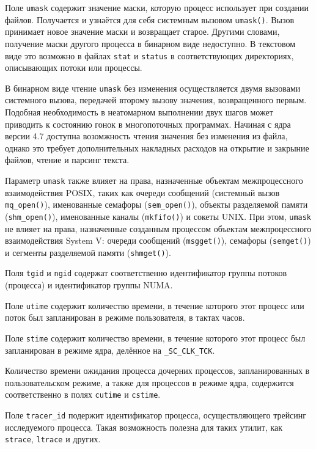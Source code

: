 Поле \texttt{umask} содержит значение маски, которую процесс использует при
создании файлов. Получается и узнаётся для себя системным вызовом
\texttt{umask()}. Вызов принимает новое значение маски и возвращает старое.
Другими словами, получение маски другого процесса в бинарном виде недоступно.
В текстовом виде это возможно в файлах \texttt{stat} и \texttt{status} в
соответствующих директориях, описывающих потоки или процессы.

В бинарном виде чтение \texttt{umask} без изменения осуществляется двумя
вызовами системного вызова, передачей второму вызову значения, возвращенного
первым. Подобная необходимость в неатомарном выполнении двух шагов может
приводить к состоянию гонок в многопоточных программах. Начиная с ядра версии
4.7 доступна возомжность чтения значения без изменения из файла, однако это
требует дополнительных накладных расходов на открытие и закрыние файлов, чтение
и парсинг текста.

Параметр \texttt{umask} также влияет на права, назначенные объектам
межпроцессного взаимодействия POSIX, таких как очереди сообщений (системный
вызов \texttt{mq\_open()}), именованные семафоры (\texttt{sem\_open()}),
объекты разделяемой памяти (\texttt{shm\_open()}), именованные каналы
(\texttt{mkfifo()}) и сокеты UNIX. При этом, \texttt{umask} не влияет на права,
назначенные созданным процессом объектам межпроцессного взаимодействия System V:
очереди сообщений (\texttt{msgget()}), семафоры (\texttt{semget()}) и сегменты
разделяемой памяти (\texttt{shmget()}).

Поля \texttt{tgid} и \texttt{ngid} содержат соответственно идентификатор группы
потоков (процесса) и идентификатор группы NUMA.

Поле \texttt{utime} содержит количество времени, в течение которого этот процесс
или поток был запланирован в режиме пользователя, в тактах часов.

Поле \texttt{stime} содержит количество времени, в течение которого этот процесс
был запланирован в режиме ядра, делённое на \texttt{\_SC\_CLK\_TCK}.

Количество времени ожидания процесса дочерних процессов, запланированных в
пользовательском режиме, а также для процессов в режиме ядра, содержится
соответственно в полях \texttt{cutime} и \texttt{cstime}.

Поле \texttt{tracer\_id} подержит идентификатор процесса, осуществляющего
трейсинг исследуемого процесса. Такая возможность полезна для таких утилит, как
\texttt{strace}, \texttt{ltrace} и других.

